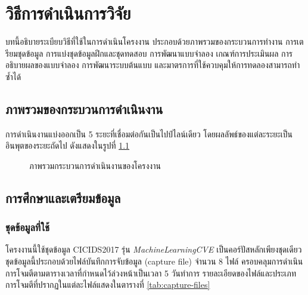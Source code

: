 \chapter{วิธีการดำเนินการวิจัย}
\label{chapter:experiment}

บทนี้อธิบายระเบียบวิธีที่ใช้ในการดำเนินโครงงาน ประกอบด้วยภาพรวมของกระบวนการทำงาน การเตรียมชุดข้อมูล การแบ่งชุดข้อมูลฝึกและชุดทดสอบ การพัฒนาแบบจำลอง เกณฑ์การประเมินผล การอธิบายผลของแบบจำลอง การพัฒนาระบบต้นแบบ และมาตรการที่ใช้ควบคุมให้การทดลองสามารถทำซ้ำได้

\section{ภาพรวมของกระบวนการดำเนินงาน}

การดำเนินงานแบ่งออกเป็น 5 ระยะที่เชื่อมต่อกันเป็นไปป์ไลน์เดียว โดยผลลัพธ์ของแต่ละระยะเป็นอินพุตของระยะถัดไป ดังแสดงในรูปที่ \ref{fig:workflow}

\begin{figure}[ht]
    \centering
    \caption{ภาพรวมกระบวนการดำเนินงานของโครงงาน}
    \label{fig:workflow}
\end{figure}

\section{การศึกษาและเตรียมข้อมูล}

\subsection{ชุดข้อมูลที่ใช้}

โครงงานนี้ใช้ชุดข้อมูล CICIDS2017 รุ่น \textit{MachineLearningCVE} เป็นคอร์ปัสหลักเพียงชุดเดียว ชุดข้อมูลนี้ประกอบด้วยไฟล์บันทึกการจับข้อมูล (capture file) จำนวน 8 ไฟล์ ครอบคลุมการดำเนินการโจมตีตามตารางเวลาที่กำหนดไว้ล่วงหน้าเป็นเวลา 5 วันทำการ \cite{sharafaldin2018cicids2017} รายละเอียดของไฟล์และประเภทการโจมตีที่ปรากฏในแต่ละไฟล์แสดงในตารางที่ \ref{tab:capture-files}

